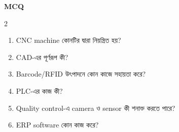 \begin{practicebox}
\textbf{MCQ}
\begin{multicols}{2}\begin{enumerate}
\item \begin{minipage}[t]{\linewidth}CNC machine কোনটির দ্বারা নিয়ন্ত্রিত হয়?\par {}\par\end{minipage}

\item \begin{minipage}[t]{\linewidth}CAD-এর পূর্ণরূপ কী?\par {}\par\end{minipage}

\item \begin{minipage}[t]{\linewidth}Barcode/RFID উৎপাদনে কোন কাজে সহায়তা করে?\par {}\par\end{minipage}

\item \begin{minipage}[t]{\linewidth}PLC-এর কাজ কী?\par {}\par\end{minipage}

\item \begin{minipage}[t]{\linewidth}Quality control-এ camera ও sensor কী শনাক্ত করতে পারে?\par {}\par\end{minipage}

\item \begin{minipage}[t]{\linewidth}ERP software কোন কাজ করে?\par {}\par\end{minipage}


\end{enumerate}
\end{multicols}
\end{practicebox}
